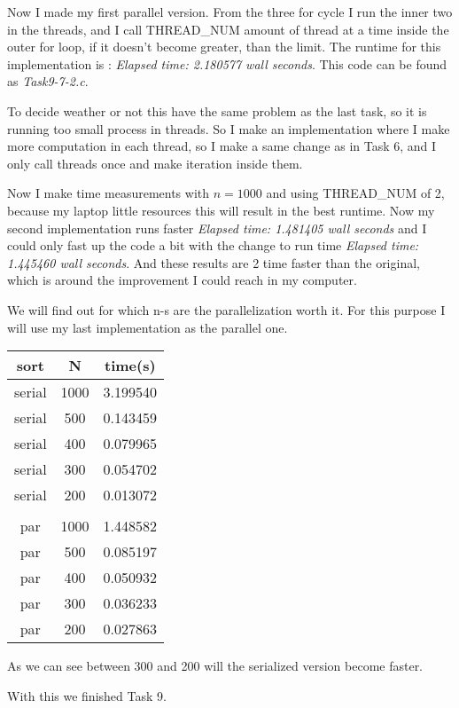Now I made my first parallel version. From the three for cycle I run the inner two in the threads, and I call THREAD\_NUM amount of thread at a time inside the outer for loop, if it doesn't become greater, than the limit. The runtime for this implementation is : \textit{Elapsed time: 2.180577 wall seconds}. This code can be found as \textit{Task9-7-2.c}. 

To decide weather or not this have the same problem as the last task, so it is running too small process in threads. So I make an implementation where I make more computation in each thread, so I make a same change as in Task 6, and I only call threads once and make iteration inside them.

Now I make time measurements with $n=1000$ and using THREAD\_NUM of 2, because my laptop little resources this will result in the best runtime. 
Now my second implementation runs faster \textit{Elapsed time: 1.481405 wall seconds} and I could only fast up the code a bit with the change to run time \textit{Elapsed time: 1.445460 wall seconds}. And these results are 2 time faster than the original, which is around the improvement I could reach in my computer.

\bigskip

We will find out for which n-s are the parallelization worth it. For this purpose I will use my last implementation as the parallel one.

\begin{tabular}{c|c|c}
sort & N & time(s)\\ \hline
serial & 1000 & 3.199540 \\
serial & 500 & 0.143459 \\
serial & 400 & 0.079965\\
serial & 300 & 0.054702\\
serial & 200 & 0.013072\\
&&\\
par & 	1000 & 1.448582\\
par & 	500 & 0.085197\\
par & 	400 & 0.050932 \\
par & 300 & 0.036233\\
par & 200 & 0.027863 
\end{tabular}    

As we can see between 300 and 200 will the serialized version become faster.


With this we finished Task 9.
